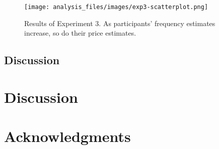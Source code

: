 \documentclass[10pt,letterpaper]{article}
\begin{document}
\begin{figure}[ht]
\begin{center}
\texttt{[image: analysis\_files/images/exp3-scatterplot.png]}
\end{center}
\caption{Results of Experiment 3. As participants' frequency estimates increase, so do their price estimates.} 
\label{exp3-scatterplot}
\end{figure}

\subsection{Discussion}


\section{Discussion}


\section{Acknowledgments}

\nocite{web1t5gram}
\nocite{lewis}
\end{document}
